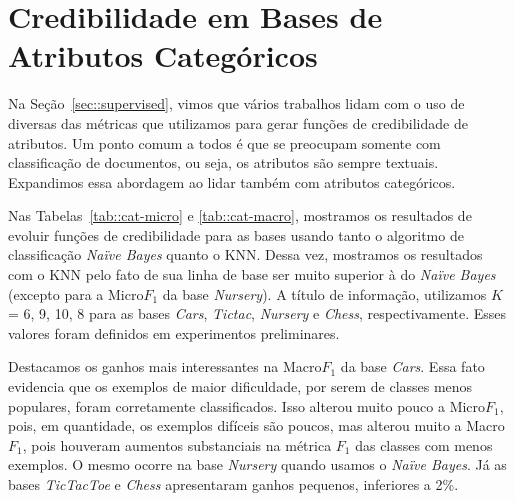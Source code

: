 

\section{Credibilidade em Bases de Atributos Categóricos}
\label{sec::categorias}


Na Seção~\ref{sec::supervised}, vimos que vários trabalhos lidam com o uso de diversas das métricas que utilizamos para gerar funções de credibilidade de atributos. Um ponto comum a todos
é que se preocupam somente com classificação de documentos, ou seja, os atributos são sempre textuais. Expandimos essa abordagem ao lidar também com atributos categóricos.

Nas Tabelas~\ref{tab::cat-micro} e \ref{tab::cat-macro}, mostramos os resultados de evoluir funções de credibilidade para as bases usando tanto o algoritmo de classificação \textit{Naïve Bayes} quanto o \textsc{KNN}. Dessa vez, mostramos os resultados com o \textsc{KNN} pelo fato de sua linha de base ser muito superior à do \textit{Naïve Bayes} (excepto para a Micro$F_1$ da base \textit{Nursery}). A título de informação, utilizamos $K$ = 6, 9, 10, 8 para as bases \textit{Cars}, \textit{Tictac}, \textit{Nursery} e \textit{Chess}, respectivamente. Esses valores foram definidos em experimentos preliminares.

Destacamos os ganhos mais interessantes na Macro$F_1$ da base \textit{Cars}. Essa fato evidencia que os exemplos de maior dificuldade, por serem de classes menos populares, foram corretamente classificados. Isso alterou muito pouco a Micro$F_1$, pois, em quantidade, os exemplos difíceis são poucos, mas alterou muito a Macro$F_1$, pois houveram aumentos substanciais na métrica $F_1$ das classes com menos exemplos. O mesmo ocorre na base \textit{Nursery} quando usamos o \textit{Naïve Bayes}. Já as bases \textit{TicTacToe} e \textit{Chess} apresentaram ganhos pequenos, inferiores a 2\%.

